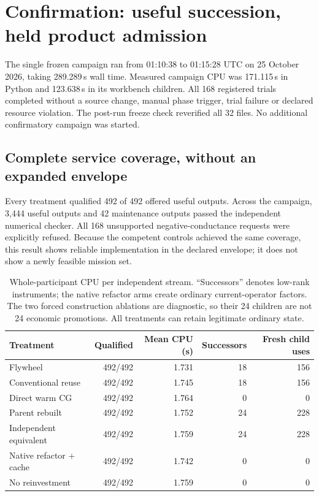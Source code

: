 \section{Confirmation: useful succession, held product admission}
\label{sec:results}

The single frozen campaign ran from 01:10:38 to 01:15:28 UTC on 25 October 2026, taking 289.289\,s wall time.
Measured campaign CPU was 171.115\,s in Python and 123.638\,s in its workbench children. All 168 registered trials
completed without a source change, manual phase trigger, trial failure or declared resource violation. The
post-run freeze check reverified all 32 files. No additional confirmatory campaign was started.

\subsection{Complete service coverage, without an expanded envelope}

Every treatment qualified 492 of 492 offered useful outputs. Across the campaign, 3,444 useful outputs and
42 maintenance outputs passed the independent numerical checker. All 168 unsupported negative-conductance
requests were explicitly refused. Because the competent controls achieved the same coverage, this result
shows reliable implementation in the declared envelope; it does not show a newly feasible mission set.

\begin{table}[htbp]\centering\small
\begin{tabularx}{\linewidth}{@{}Yrrrr@{}}\toprule
Treatment & Qualified & Mean CPU (s) & Successors & Fresh child uses \\\midrule
Flywheel & 492/492 & 1.731 & 18 & 156 \\
Conventional reuse & 492/492 & 1.745 & 18 & 156 \\
Direct warm CG & 492/492 & 1.764 & 0 & 0 \\
Parent rebuilt & 492/492 & 1.752 & 24 & 228 \\
Independent equivalent & 492/492 & 1.759 & 24 & 228 \\
Native refactor + cache & 492/492 & 1.742 & 0 & 0 \\
No reinvestment & 492/492 & 1.759 & 0 & 0 \\\bottomrule
\end{tabularx}
\caption{Whole-participant CPU per independent stream. ``Successors'' denotes low-rank instruments; the native
refactor arms create ordinary current-operator factors. The two forced construction ablations are diagnostic,
so their 24 children are not 24 economic promotions. All treatments can retain legitimate ordinary state.}
\label{tab:main}
\end{table}

